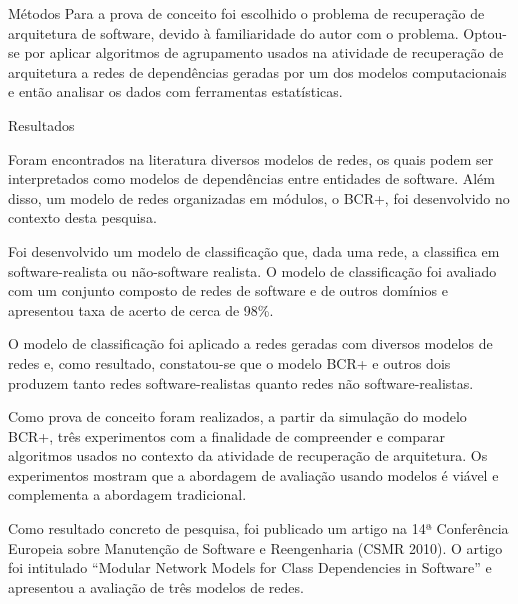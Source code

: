 \begin{section}{Métodos}
	Para a prova de conceito foi escolhido o problema de recuperação de arquitetura de software, devido à familiaridade do autor com o problema. Optou-se por aplicar algoritmos de agrupamento usados na atividade de recuperação de arquitetura a redes de dependências geradas por um dos modelos computacionais e então analisar os dados com ferramentas estatísticas.

\end{section}

\begin{section}{Resultados}
	
	Foram encontrados na literatura diversos modelos de redes, os quais podem ser interpretados como modelos de dependências entre entidades de software. Além disso, um modelo de redes organizadas em módulos, o BCR+, foi desenvolvido no contexto desta pesquisa.
	
	Foi desenvolvido um modelo de classificação que, dada uma rede, a classifica em software-realista ou não-software realista. O modelo de classificação foi avaliado com um conjunto composto de redes de software e de outros domínios e apresentou taxa de acerto de cerca de 98\%.
	
	O modelo de classificação foi aplicado a redes geradas com diversos modelos de redes e, como resultado, constatou-se que o modelo BCR+ e outros dois produzem tanto redes software-realistas quanto redes não software-realistas. %
	
	Como prova de conceito foram realizados, a partir da simulação do modelo BCR+, três experimentos com a finalidade de compreender e comparar algoritmos usados no contexto da atividade de recuperação de arquitetura. Os experimentos mostram que a abordagem de avaliação usando modelos é viável e complementa a abordagem tradicional.
	
	Como resultado concreto de pesquisa, foi publicado um artigo na 14ª Conferência Europeia sobre Manutenção de Software e Reengenharia (CSMR 2010). O artigo foi intitulado ``Modular Network Models for Class Dependencies in Software'' e apresentou a avaliação de três modelos de redes.

	
\end{section}

